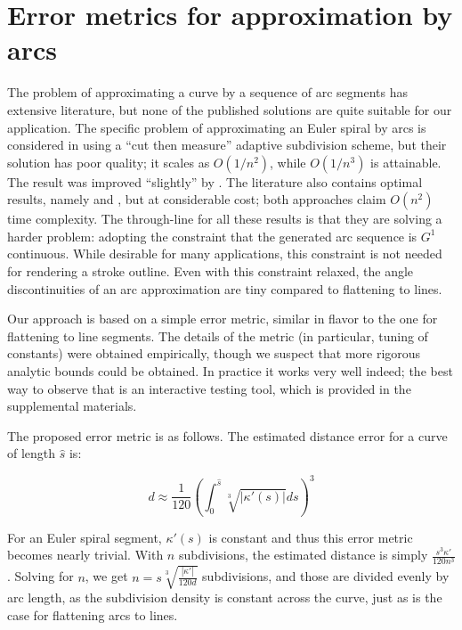 \documentclass[sigconf, nonacm]{acmart}
\begin{document}
\section{Error metrics for approximation by arcs}

The problem of approximating a curve by a sequence of arc segments has extensive literature, but none of the published solutions are quite suitable for our application. The specific problem of approximating an Euler spiral by arcs is considered in \citet{Meek2004} using a ``cut then measure'' adaptive subdivision scheme, but their solution has poor quality; it scales as $O(1/n^2)$, while $O(1/n^3)$ is attainable. The result was improved ``slightly'' by \citet{Narayan2014}. The literature also contains optimal results, namely \citet{Maier2014} and \citet{Nuntawisuttiwong2021}, but at considerable cost; both approaches claim $O(n^2)$ time complexity. The through-line for all these results is that they are solving a harder problem: adopting the constraint that the generated arc sequence is $G^1$ continuous. While desirable for many applications, this constraint is not needed for rendering a stroke outline. Even with this constraint relaxed, the angle discontinuities of an arc approximation are tiny compared to flattening to lines.


Our approach is based on a simple error metric, similar in flavor to the one for flattening to line segments. The details of the metric (in particular, tuning of constants) were obtained empirically, though we suspect that more rigorous analytic bounds could be obtained. In practice it works very well indeed; the best way to observe that is an interactive testing tool, which is provided in the supplemental materials.

The proposed error metric is as follows. The estimated distance error for a curve of length $\hat{s}$ is:

\[
    d \approx \frac{1}{120}\left(\int_0^{\hat{s}} \sqrt[3]{|\kappa'(s)|}ds \right)^3
\]

For an Euler spiral segment, $\kappa'(s)$ is constant and thus this error metric becomes nearly trivial. With $n$ subdivisions, the estimated distance is simply $\frac{s^3\kappa'}{120n^3}$. Solving for $n$, we get $n = s\sqrt[3]{\frac{|\kappa'|}{120d}}$ subdivisions, and those are divided evenly by arc length, as the subdivision density is constant across the curve, just as is the case for flattening arcs to lines.
\end{document}
